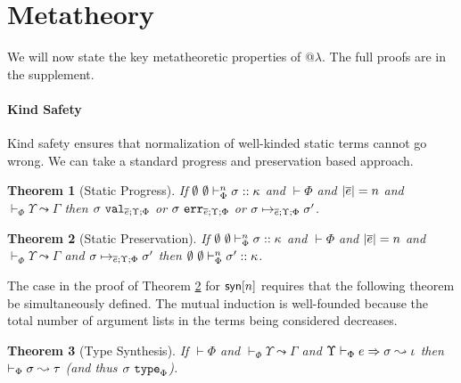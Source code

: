 \documentclass[10pt,preprint]{sigplanconf}
\newtheorem{theorem}{Theorem}
\newtheorem{lemma}{Lemma}
\begin{document}


\section{Metatheory}\label{metatheory}
We will now state the key metatheoretic properties of @$\lambda$. The full proofs are in the supplement. 

\paragraph{Kind Safety} Kind safety ensures that normalization of well-kinded static terms cannot go wrong. We can take a standard progress and preservation based approach. 
\begin{theorem}[Static Progress]\label{thm:static-progress}
If $\emptyset~\emptyset \vdash_{\Phi}^{n} \sigma :: \kappa$ and $\vdash \Phi$ and $|\overline{e}|=n$ and $\vdash_\Phi \Upsilon \leadsto \Gamma$ then $\sigma~\mathtt{val}_{\overline{e}; \Upsilon; \Phi}$ or $\sigma~\mathtt{err}_{\overline{e}; \Upsilon; \Phi}$ or $\sigma \mapsto_{\overline{e}; \Upsilon; \Phi} \sigma'$.
\end{theorem}

\begin{theorem}[Static Preservation]\label{thm:static-preservation}
If $\emptyset~\emptyset \vdash_{\Phi}^{n} \sigma :: \kappa$ and $\vdash \Phi$ and $|\overline{e}|=n$ and $\vdash_\Phi \Upsilon \leadsto \Gamma$ and $\sigma \mapsto_{\overline{e}; \Upsilon; \Phi} \sigma'$ then $\emptyset~\emptyset \vdash_{\Phi}^{n} \sigma' :: \kappa$.
\end{theorem}
The case in the proof of Theorem \ref{thm:static-preservation} for ${\sf syn}[n]$ requires that the following theorem be simultaneously defined. The mutual induction is well-founded because the total number of argument lists in the terms being considered decreases.
\begin{theorem}[Type Synthesis]
If $\vdash \Phi$ and $\vdash_\Phi \Upsilon \leadsto \Gamma$ and $\Upsilon \vdash_{\Phi} e \Rightarrow \sigma \leadsto \iota$ then $\vdash_\Phi \sigma \leadsto \tau$ (and thus $\sigma~\texttt{type}_{\Phi}$). 
\end{theorem}
\end{document}

